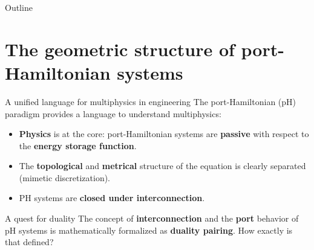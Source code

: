 \documentclass[aspectratio=169]{beamer}
\begin{document}
	
	
	\begin{frame}[plain]
		
		
		
	\end{frame}
	
	
	\begin{frame}{Outline}
		
		\tableofcontents
		
	\end{frame}


\section{The geometric structure of port-Hamiltonian systems}

\begin{frame}{A unified language for multiphysics in engineering}
	The port-Hamiltonian (pH) paradigm provides a language to understand multiphysics:
	\vspace{.3cm}

			\begin{itemize}
				\item \textbf{Physics} is at the core: port-Hamiltonian systems are \textbf{passive} with respect to the \textbf{energy storage function}.
				\item The \textbf{topological} and \textbf{metrical} structure of the equation is clearly separated (mimetic discretization).
				\item PH systems are \textbf{closed under interconnection}. 
			\end{itemize}

	\begin{block}{A quest for duality}
		The concept of \textbf{interconnection} and the \textbf{port} behavior of pH systems is mathematically formalized as \textbf{duality pairing}. How exactly is that defined?
	\end{block}
	
	
\end{frame}
\end{document}
